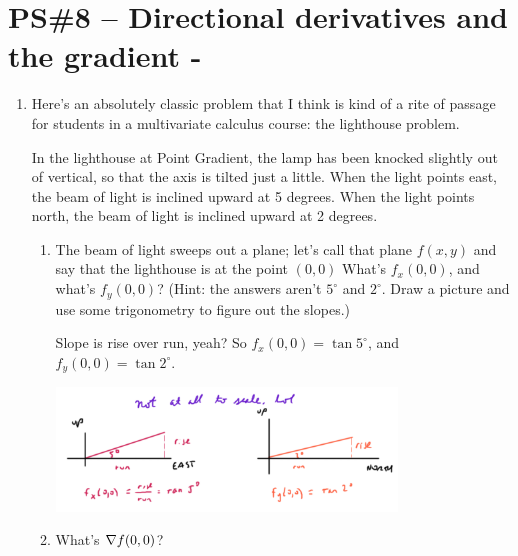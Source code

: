 


%


\allowdisplaybreaks
\section{PS\#8 -- Directional derivatives and the gradient -  }

\begin{enumerate}[leftmargin=0pt]
    
    \item Here's an absolutely classic problem that I think is kind of a rite of passage for students in a multivariate calculus course: the lighthouse problem.
    
    In the lighthouse at Point Gradient, the lamp has been knocked slightly out of vertical, so that the axis is tilted just a little. When the light points east, the beam of light is inclined upward at 5 degrees. When the light points north, the beam of light is inclined upward at 2 degrees.
    
    \begin{enumerate}
        \item The beam of light sweeps out a plane; let's call that plane $f(x, y)$ and say that the lighthouse is at the point $(0, 0)$ What's $f_x(0, 0)$, and what's $f_y(0, 0)$? (Hint: the answers aren't $5^\circ$ and $2^\circ$. Draw a picture and use some trigonometry to figure out the slopes.)
        
        \begin{red}
        Slope is rise over run, yeah? So $f_x(0, 0) = \tan 5^\circ$, and  $f_y(0, 0) = \tan 2^\circ$.
        
        \begin{center}
        \includegraphics[width=0.75\textwidth]{../images/triangles.png}
        \end{center}
        \end{red}
        \item What's $\nabla f(0, 0)$? 
        

\end{enumerate}
\end{enumerate}
